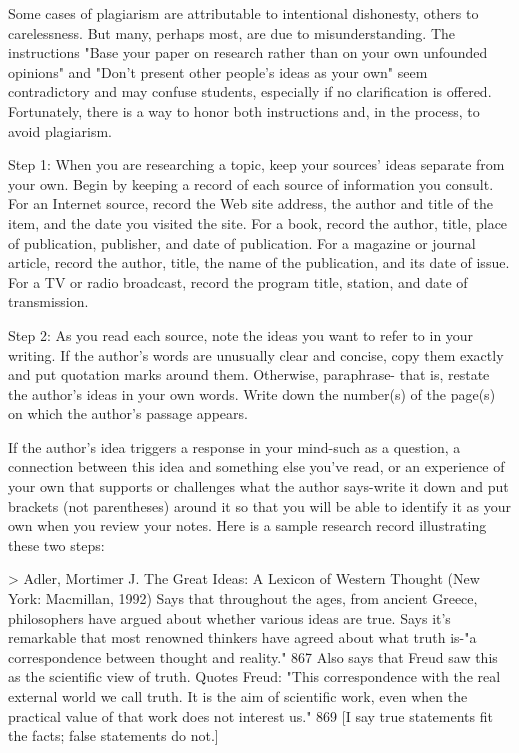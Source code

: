 \documentclass{book}
\begin{document}
Some cases of plagiarism are attributable to intentional dishonesty, others to carelessness. But many, perhaps most, are due to misunderstanding.  The instructions "Base your paper on research rather than on your own unfounded opinions" and "Don’t present other people’s ideas as your own" seem contradictory and may confuse students, especially if no clarification is offered. Fortunately, there is a way to honor both instructions and, in the process, to avoid plagiarism.

Step 1: When you are researching a topic, keep your sources’ ideas separate from your own. Begin by keeping a record of each source of information you consult. For an Internet source, record the Web site address, the author and title of the item, and the date you visited the site.  For a book, record the author, title, place of publication, publisher, and date of publication. For a magazine or journal article, record the author, title, the name of the publication, and its date of issue. For a TV or radio broadcast, record the program title, station, and date of transmission.

Step 2: As you read each source, note the ideas you want to refer to in your writing. If the author’s words are unusually clear and concise, copy them exactly and put quotation marks around them. Otherwise, paraphrase- that is, restate the author’s ideas in your own words. Write down the number(s) of the page(s) on which the author’s passage appears.

If the author’s idea triggers a response in your mind-such as a question, a connection between this idea and something else you’ve read, or an experience of your own that supports or challenges what the author says-write it down and put brackets (not parentheses) around it so that you will be able to identify it as your own when you review your notes.  Here is a sample research record illustrating these two steps:

> Adler, Mortimer J. The Great Ideas: A Lexicon of Western Thought (New York: Macmillan, 1992) Says that throughout the ages, from ancient Greece, philosophers have argued about whether various ideas are true. Says it’s remarkable that most renowned thinkers have agreed about what truth is-"a correspondence between thought and reality." 867 Also says that Freud saw this as the scientific view of truth. Quotes Freud: "This correspondence with the real external world we call truth. It is the aim of scientific work, even when the practical value of that work does not interest us." 869 [I say true statements fit the facts; false statements do not.]
\end{document}
